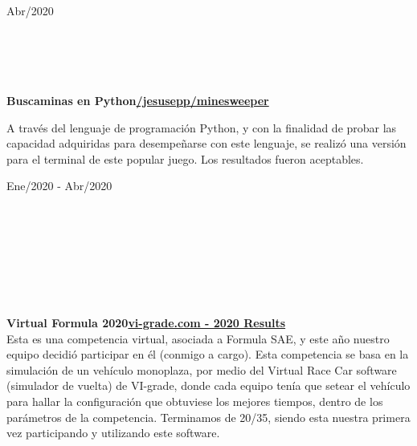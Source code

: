 \documentclass[10pt]{article}
\begin{document}
\begin{vwcol}[widths={0.235,0.765},
 sep=.8cm, rule=0pt,indent=0em,lines=5] 
\hspace{5pt}Abr/2020\par
    \hfill\\
    \hfill\\
    \hfill\\
    \hfill\\
    \textbf{Buscaminas en Python}\hfill \href{https://github.com/jesusepp/minesweeper}{\color{blue!50!black}\textbf{/jesusepp/minesweeper}}\\
    \vspace{5pt}
    
    A través del lenguaje de programación Python, y con la finalidad de probar las capacidad adquiridas para desempeñarse con este lenguaje, se realizó una versión para el terminal de este popular juego. Los resultados fueron aceptables.\par
\end{vwcol}

\begin{vwcol}[widths={0.235,0.765},
 sep=.8cm, rule=0pt,indent=0em,lines=8] 
\hspace{5pt}Ene/2020 - Abr/2020\par
    \hfill\\
    \hfill\\
    \hfill\\
    \hfill\\
    \hfill\\
    \hfill\\
    \hfill\\
    \textbf{Virtual Formula 2020}\hfill \href{https://www.vi-grade.com/en/about/virtual_formulas/virtual-formula-2020/?#virtualformula2020}{\color{blue!50!black}\textbf{vi-grade.com - 2020 Results}}\\
    \vspace{5pt}
    Esta es una competencia virtual, asociada a Formula SAE, y este año nuestro equipo decidió participar en él (conmigo a cargo). Esta competencia se basa en la simulación de un vehículo monoplaza, por medio del Virtual Race Car software (simulador de vuelta) de VI-grade, donde cada equipo tenía que setear el vehículo para hallar la configuración que obtuviese los mejores tiempos, dentro de los parámetros de la competencia. Terminamos de 20/35, siendo esta nuestra primera vez participando y utilizando este software.\par
\end{vwcol}
\end{document}
